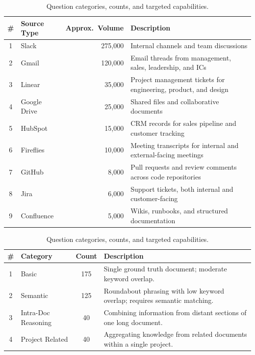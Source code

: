 \documentclass{article}
\begin{document}
\begin{table}[t!]
  \caption{Enterprise source types and approximate document volumes.}
  \label{tab:sources}
  \centering
  \small
  \begin{tabular*}{\textwidth}{@{\extracolsep{\fill}}clrp{8.5cm}}
    \toprule
    \# & Source Type   & Approx.\ Volume & Description \\
    \midrule
    1  & Slack         & 275,000 & Internal channels and team discussions \\
    2  & Gmail         & 120,000 & Email threads from management, sales, leadership, and ICs \\
    3  & Linear        &  35,000 & Project management tickets for engineering, product, and design \\
    4  & Google Drive  &  25,000 & Shared files and collaborative documents \\
    5  & HubSpot       &  15,000 & CRM records for sales pipeline and customer tracking \\
    6  & Fireflies     &  10,000 & Meeting transcripts for internal and external-facing meetings \\
    7  & GitHub        &   8,000 & Pull requests and review comments across code repositories \\
    8  & Jira          &   6,000 & Support tickets, both internal and customer-facing \\
    9  & Confluence    &   5,000 & Wikis, runbooks, and structured documentation \\
    \bottomrule
  \end{tabular*}
  \vspace{1em}
  \caption{Question categories, counts, and targeted capabilities.}
  \label{tab:question_types}
  \centering
  \small
  \begin{tabular*}{\textwidth}{@{\extracolsep{\fill}}clcp{8.5cm}}
    \toprule
    \# & Category & Count & Description \\
    \midrule
     1 & Basic                    & 175 & Single ground truth document; moderate keyword overlap. \\
     2 & Semantic                 & 125 & Roundabout phrasing with low keyword overlap; requires semantic matching. \\
     3 & Intra-Doc Reasoning      &  40 & Combining information from distant sections of one long document. \\
     4 & Project Related          &  40 & Aggregating knowledge from related documents within a single project. \\

\end{tabular*}
\end{table}
\end{document}
